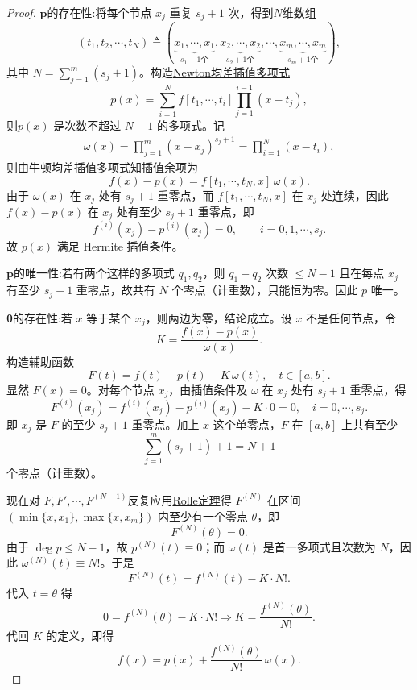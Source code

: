 \documentclass[../../main.tex]{subfiles}%
\begin{document}
\begin{proof}

$\boldsymbol{p}${\heiti 的存在性}:将每个节点 $x_j$ 重复 $s_j+1$ 次，得到$N$维数组
\[
\left( t_1,t_2,\cdots ,t_N \right) \triangleq \left( \underset{s_1+1\text{个}}{\underbrace{x_1,\cdots ,x_1}},\underset{s_2+1\text{个}}{\underbrace{x_2,\cdots ,x_2}},\cdots ,\underset{s_m+1\text{个}}{\underbrace{x_m,\cdots ,x_m}} \right) ,
\]
其中 $N = \sum_{j=1}^m (s_j+1)$。构造\hyperref[Numerical Analysis-theorem:牛顿均差插值多项式]{Newton均差插值多项式}
\[
p(x) = \sum_{i=1}^{N} f[t_1,\cdots,t_i] \prod_{j=1}^{i-1} (x - t_j),
\]
则$p(x)$ 是次数不超过 $N-1$ 的多项式。记
\begin{align*}
\omega(x)=\prod_{j=1}^m (x-x_j)^{s_j+1}=\prod_{i=1}^N (x-t_i),
\end{align*}
则由\hyperref[Numerical Analysis-theorem:牛顿均差插值多项式]{牛顿均差插值多项式}知插值余项为
\[
f(x)-p(x)=f[t_1,\cdots,t_N,x]\,\omega(x).
\]
由于 $\omega(x)$ 在 $x_j$ 处有 $s_j+1$ 重零点，而 $f[t_1,\cdots,t_N,x]$ 在 $x_j$ 处连续，因此 $f(x)-p(x)$ 在 $x_j$ 处有至少 $s_j+1$ 重零点，即
\[
f^{(i)}(x_j)-p^{(i)}(x_j)=0,\qquad i=0,1,\cdots,s_j.
\]
故 $p(x)$ 满足 Hermite 插值条件。

$\boldsymbol{p}${\heiti 的唯一性}:若有两个这样的多项式 $q_1,q_2$，则 $q_1-q_2$ 次数 $\leqslant N-1$ 且在每点 $x_j$ 有至少 $s_j+1$ 重零点，故共有 $N$ 个零点（计重数），只能恒为零。因此 $p$ 唯一。

$\boldsymbol{\theta }${\heiti 的存在性}:若 $x$ 等于某个 $x_j$，则两边为零，结论成立。设 $x$ 不是任何节点，令
\[
K = \frac{f(x)-p(x)}{\omega(x)}.
\]
构造辅助函数
\[
F(t) = f(t) - p(t) - K\,\omega(t),\quad t\in[a,b].
\]
显然 $F(x)=0$。对每个节点 $x_j$，由插值条件及 $\omega$ 在 $x_j$ 处有 $s_j+1$ 重零点，得
\[
F^{(i)}(x_j) = f^{(i)}(x_j)-p^{(i)}(x_j)-K\cdot0 = 0,\quad i=0,\cdots,s_j.
\]
即 $x_j$ 是 $F$ 的至少 $s_j+1$ 重零点。加上 $x$ 这个单零点，$F$ 在 $[a,b]$ 上共有至少
\[
\sum_{j=1}^m (s_j+1) + 1 = N+1
\]
个零点（计重数）。

现在对 $F,F',\cdots,F^{(N-1)}$反复应用\hyperref[theorem:加强的Rolle中值定理]{Rolle定理}得 $F^{(N)}$ 在区间 $(\min\{x,x_1\},\max\{x,x_m\})$ 内至少有一个零点 $\theta$，即
\[
F^{(N)}(\theta)=0.
\]
由于 $\deg p \leqslant N-1$，故 $p^{(N)}(t)\equiv0$；而 $\omega(t)$ 是首一多项式且次数为 $N$，因此 $\omega^{(N)}(t) \equiv N!$。于是
\[
F^{(N)}(t) = f^{(N)}(t) - K\cdot N!.
\]
代入 $t=\theta$ 得
\[
0 = f^{(N)}(\theta) - K\cdot N! \Longrightarrow K = \frac{f^{(N)}(\theta)}{N!}.
\]
代回 $K$ 的定义，即得
\[
f(x) =p(x) + \frac{f^{(N)}(\theta)}{N!}\,\omega(x).
\]\end{proof}
\end{document}
